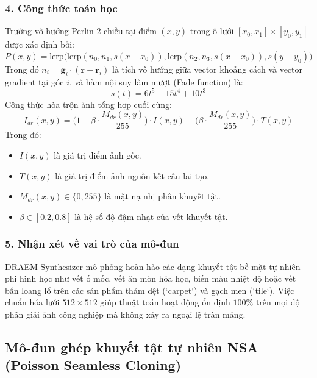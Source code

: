 \subsubsection*{4. Công thức toán học}
Trường vô hướng Perlin 2 chiều tại điểm $(x, y)$ trong ô lưới $[x_0, x_1] \times [y_0, y_1]$ được xác định bởi:
\begin{equation}
    P(x, y) = \text{lerp}\Big(\text{lerp}(n_0, n_1, s(x - x_0)), \text{lerp}(n_2, n_3, s(x - x_0)), s(y - y_0)\Big)
\end{equation}
Trong đó $n_i = \mathbf{g}_i \cdot (\mathbf{r} - \mathbf{r}_i)$ là tích vô hướng giữa vector khoảng cách và vector gradient tại góc $i$, và hàm nội suy làm mượt (Fade function) là:
\begin{equation}
    s(t) = 6t^5 - 15t^4 + 10t^3
\end{equation}
Công thức hòa trộn ảnh tổng hợp cuối cùng:
\begin{equation}
    I_{dr}(x, y) = \Big(1 - \beta \cdot \frac{M_{dr}(x, y)}{255}\Big) \cdot I(x, y) + \Big(\beta \cdot \frac{M_{dr}(x, y)}{255}\Big) \cdot T(x, y)
\end{equation}
Trong đó:
\begin{itemize}
    \item $I(x, y)$ là giá trị điểm ảnh gốc.
    \item $T(x, y)$ là giá trị điểm ảnh nguồn kết cấu lai tạo.
    \item $M_{dr}(x, y) \in \{0, 255\}$ là mặt nạ nhị phân khuyết tật.
    \item $\beta \in [0.2, 0.8]$ là hệ số độ đậm nhạt của vết khuyết tật.
\end{itemize}

\subsubsection*{5. Nhận xét về vai trò của mô-đun}
DRAEM Synthesizer mô phỏng hoàn hảo các dạng khuyết tật bề mặt tự nhiên phi hình học như vết ố mốc, vết ăn mòn hóa học, biến màu nhiệt độ hoặc vết bẩn loang lổ trên các sản phẩm thảm dệt (`carpet`) và gạch men (`tile`). Việc chuẩn hóa lưới $512 \times 512$ giúp thuật toán hoạt động ổn định $100\%$ trên mọi độ phân giải ảnh công nghiệp mà không xảy ra ngoại lệ tràn mảng.

\subsection{Mô-đun ghép khuyết tật tự nhiên NSA (Poisson Seamless Cloning)}

